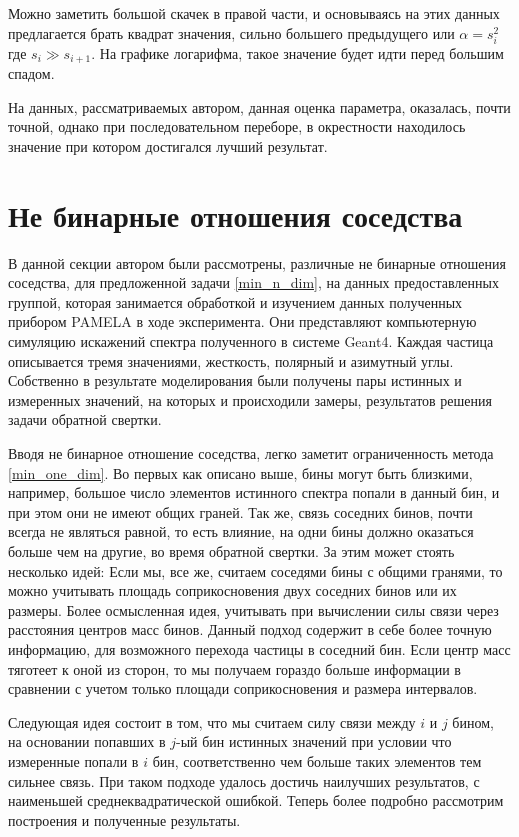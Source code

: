 \documentclass[a4paper,12pt]{diplom}
\begin{document}
Можно заметить большой скачек в правой части, и основываясь на этих данных предлагается брать квадрат значения, сильно большего предыдущего или
$\alpha = s^2_{i}$ где $ s_{i} \gg s_{i+1} $. 
На графике логарифма, такое значение будет идти перед большим спадом.

На данных, рассматриваемых автором, данная оценка параметра, оказалась, почти точной, однако при последовательном переборе, в окрестности 
находилось значение при котором достигался лучший результат.

\section{Не бинарные отношения соседства}

В данной секции автором были рассмотрены, различные не бинарные отношения соседства, для предложенной задачи \eqref{min_n_dim}, на данных 
предоставленных группой, которая занимается обработкой и изучением данных полученных прибором PAMELA в ходе эксперимента. Они представляют 
компьютерную симуляцию искажений спектра полученного в системе Geant4. Каждая частица описывается тремя значениями, жесткость, полярный и 
азимутный углы. Собственно в результате моделирования были получены пары истинных и измеренных значений, на которых и происходили замеры, 
результатов решения задачи обратной свертки.

Вводя не бинарное отношение соседства, легко заметит ограниченность метода \eqref{min_one_dim}. Во первых как описано выше, бины могут 
быть близкими, например, большое число элементов истинного спектра попали в данный бин, и при этом они не имеют общих граней. Так же, 
связь соседних бинов, почти всегда не являться равной, то есть влияние, на одни бины должно оказаться больше чем на другие, во время 
обратной свертки. За этим может стоять несколько идей: Если мы, все же, считаем соседями бины с общими гранями, то можно учитывать 
площадь соприкосновения двух соседних бинов или их размеры. Более осмысленная идея, учитывать при вычислении силы связи через расстояния 
центров масс бинов. Данный подход содержит в себе более точную информацию, для возможного перехода частицы в соседний бин. Если центр масс 
тяготеет к оной из сторон, то мы получаем гораздо больше информации в сравнении с учетом только площади соприкосновения и размера интервалов. 

Следующая идея состоит в том, что мы считаем силу связи между $i$ и $j$ бином, на основании попавших в $j$-ый бин истинных значений при условии
что измеренные попали в $i$ бин, соответственно чем больше таких элементов тем сильнее связь. При таком подходе удалось достичь наилучших 
результатов, с наименьшей среднеквадратической ошибкой. Теперь более подробно рассмотрим построения и полученные результаты.
\end{document}
